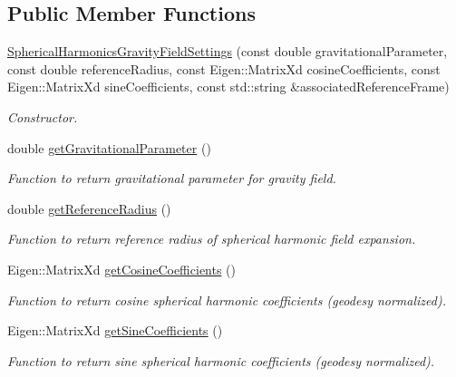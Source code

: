 \subsection*{Public Member Functions}
\begin{DoxyCompactItemize}
\item 
\hyperlink{classtudat_1_1simulation__setup_1_1SphericalHarmonicsGravityFieldSettings_af2f87c838c2d1b8e6b785d0fe46fe2ed}{Spherical\+Harmonics\+Gravity\+Field\+Settings} (const double gravitational\+Parameter, const double reference\+Radius, const Eigen\+::\+Matrix\+Xd cosine\+Coefficients, const Eigen\+::\+Matrix\+Xd sine\+Coefficients, const std\+::string \&associated\+Reference\+Frame)
\begin{DoxyCompactList}\small\item\em Constructor. \end{DoxyCompactList}\item 
double \hyperlink{classtudat_1_1simulation__setup_1_1SphericalHarmonicsGravityFieldSettings_aef2f0df360b63ce50be3e8c8187ac1de}{get\+Gravitational\+Parameter} ()
\begin{DoxyCompactList}\small\item\em Function to return gravitational parameter for gravity field. \end{DoxyCompactList}\item 
double \hyperlink{classtudat_1_1simulation__setup_1_1SphericalHarmonicsGravityFieldSettings_a06e6e0ca92a788a758717fb9326586ff}{get\+Reference\+Radius} ()
\begin{DoxyCompactList}\small\item\em Function to return reference radius of spherical harmonic field expansion. \end{DoxyCompactList}\item 
Eigen\+::\+Matrix\+Xd \hyperlink{classtudat_1_1simulation__setup_1_1SphericalHarmonicsGravityFieldSettings_a87662d525e51f93282a4f4a0f455c744}{get\+Cosine\+Coefficients} ()
\begin{DoxyCompactList}\small\item\em Function to return cosine spherical harmonic coefficients (geodesy normalized). \end{DoxyCompactList}\item 
Eigen\+::\+Matrix\+Xd \hyperlink{classtudat_1_1simulation__setup_1_1SphericalHarmonicsGravityFieldSettings_af4e24e25017efcb3718993206c520293}{get\+Sine\+Coefficients} ()
\begin{DoxyCompactList}\small\item\em Function to return sine spherical harmonic coefficients (geodesy normalized). \end{DoxyCompactList}\item 

\end{DoxyCompactItemize}
